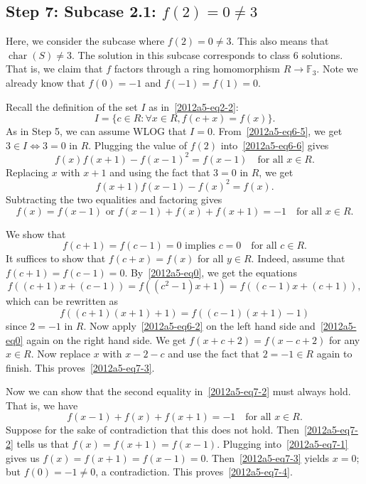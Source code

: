 \documentclass{article}
\newcommand{\F}{\mathbb{F}}
\DeclareMathOperator{\rchar}{char}
\begin{document}
\subsection*{Step 7: Subcase 2.1: $f(2) = 0 \neq 3$}

Here, we consider the subcase where $f(2) = 0 \neq 3$.
This also means that $\rchar(S) \neq 3$.
The solution in this subcase corresponds to class 6 solutions.
That is, we claim that $f$ factors through a ring homomorphism $R \to \F_3$.
Note we already know that $f(0) = -1$ and $f(-1) = f(1) = 0$.

Recall the definition of the set $I$ as in~\eqref{2012a5-eq2-2}:
\[ I = \{c \in R : \forall x \in R, f(c + x) = f(x)\}. \]
As in Step 5, we can assume WLOG that $I = 0$.
From~\eqref{2012a5-eq6-5}, we get $3 \in I \iff 3 = 0$ in $R$.
Plugging the value of $f(2)$ into~\eqref{2012a5-eq6-6} gives
\[ f(x) f(x + 1) - f(x - 1)^2 = f(x - 1) \quad \text{for all } x \in R. \tag{7.1}\label{2012a5-eq7-1} \]
Replacing $x$ with $x + 1$ and using the fact that $3 = 0$ in $R$, we get
\[ f(x + 1) f(x - 1) - f(x)^2 = f(x). \]
Subtracting the two equalities and factoring gives
\[ f(x) = f(x - 1) \text{ or } f(x - 1) + f(x) + f(x + 1) = -1 \quad \text{for all } x \in R. \tag{7.2}\label{2012a5-eq7-2} \]

We show that
\[ f(c + 1) = f(c - 1) = 0 \text{ implies } c = 0 \quad \text{for all } c \in R. \tag{7.3}\label{2012a5-eq7-3} \]
It suffices to show that $f(c + x) = f(x)$ for all $y \in R$.
Indeed, assume that $f(c + 1) = f(c - 1) = 0$.
By~\eqref{2012a5-eq0}, we get the equations
\[ f((c + 1) x + (c - 1)) = f((c^2 - 1) x + 1) = f((c - 1) x + (c + 1)), \]
    which can be rewritten as
\[ f((c + 1)(x + 1) + 1) = f((c - 1)(x + 1) - 1) \]
    since $2 = -1$ in $R$.
Now apply~\eqref{2012a5-eq6-2} on the left hand side and~\eqref{2012a5-eq0} again on the right hand side.
We get $f(x + c + 2) = f(x - c + 2)$ for any $x \in R$.
Now replace $x$ with $x - 2 - c$ and use the fact that $2 = -1 \in R$ again to finish.
This proves~\eqref{2012a5-eq7-3}.

Now we can show that the second equality in~\eqref{2012a5-eq7-2} must always hold.
That is, we have
\[ f(x - 1) + f(x) + f(x + 1) = -1 \quad \text{for all } x \in R. \tag{7.4}\label{2012a5-eq7-4} \]
Suppose for the sake of contradiction that this does not hold.
Then~\eqref{2012a5-eq7-2} tells us that $f(x) = f(x + 1) = f(x - 1)$.
Plugging into~\eqref{2012a5-eq7-1} gives us $f(x) = f(x + 1) = f(x - 1) = 0$.
Then~\eqref{2012a5-eq7-3} yields $x = 0$; but $f(0) = -1 \neq 0$, a contradiction.
This proves~\eqref{2012a5-eq7-4}.
\end{document}
